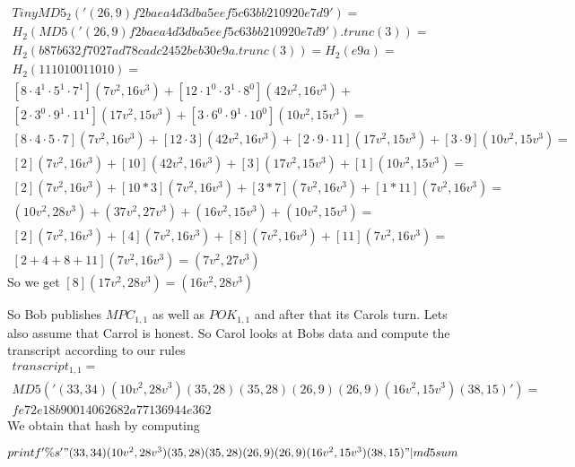 \begin{example}
\begin{align*}
TinyMD5_{2}('(26,9)f2baea4d3dba5eef5c63bb210920e7d9') =\\ H_2(MD5('(26,9)f2baea4d3dba5eef5c63bb210920e7d9').trunc(3))=\\ H_2(b87b632f7027ad78cadc2452beb30e9a.trunc(3))= H_2(e9a) = \\
H_2(111 010 011 010)=\\
[8\cdot 4^{1}\cdot 5^{1}\cdot 7^{1}](7v^2 , 16v^3)+
[12\cdot 1^{0}\cdot 3^{1}\cdot 8^{0}](42v^2 , 16v^3 )+\\
[2\cdot 3^{0}\cdot 9^{1}\cdot 11^{1}](17v^2 , 15v^3 ) +
[3\cdot 6^{0}\cdot 9^{1}\cdot 10^{0}](10v^2 , 15v^3 )= \\
[8\cdot 4\cdot 5\cdot 7](7v^2 , 16v^3)+
[12\cdot 3](42v^2 , 16v^3 )+
[2\cdot 9\cdot 11](17v^2 , 15v^3 ) +
[3\cdot 9](10v^2 , 15v^3 )= \\
[2](7v^2 , 16v^3)+
[10](42v^2 , 16v^3 )+
[3](17v^2 , 15v^3 ) +
[1](10v^2 , 15v^3 )= \\
[2](7v^2 , 16v^3)+
[10*3](7v^2 , 16v^3 )+
[3*7](7v^2 , 16v^3 ) +
[1*11](7v^2 , 16v^3 )=\\
(10v^2 , 28v^3)+
(37v^2 , 27v^3 )+
(16v^2 , 15v^3 ) +
(10v^2 , 15v^3 )=\\
[2](7v^2 , 16v^3)+
[4](7v^2 , 16v^3 )+
[8](7v^2 , 16v^3 ) +
[11](7v^2 , 16v^3 )=\\
[2+4+8+11](7v^2 , 16v^3)=
(7v^2 , 27v^3 )
\end{align*}
So we get $[8](17v^2 , 28v^3 )= (16v^2 , 28v^3 )$

So Bob publishes $MPC_{1,1}$ as well as $POK_{1,1}$ and after that its Carols turn. Lets also assume that Carrol is honest. So Carol looks at Bobs data and compute the transcript according to our rules
\begin{multline*}
transcript_{1,1}=\\ 
MD5('
(33,34)(10v^2,28v^3)(35,28)(35,28)(26,9)(26,9)(16v^2,15v^3)(38,15)') =\\ fe72e18b90014062682a77136944e362
\end{multline*}
We obtain that hash by computing

$printf '\%s' "(33,34)(10v^2,28v^3)(35,28)(35,28)(26,9)(26,9)(16v^2,15v^3)(38,15)" | md5sum$


\end{example}
